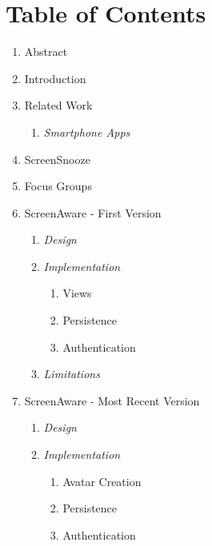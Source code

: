 \documentclass[12pt, title page, manuscript, nonacm]{acmart}
\begin{document}
\section*{Table of Contents}
\begin{enumerate}[label=\arabic*,leftmargin=*,labelsep=2ex,ref=\arabic*]
    \item Abstract 
    \item Introduction 
    \item Related Work 
    \begin{enumerate}[label*=.\arabic*,leftmargin=*,labelsep=2ex]
        \item \textit{Smartphone Apps} 
    \end{enumerate}
    \item ScreenSnooze 
    \item Focus Groups 
    \item ScreenAware - First Version 
    \begin{enumerate}[label*=.\arabic*,leftmargin=*,labelsep=2ex]
        \item \textit{Design} 
        \item \textit{Implementation} 
        \begin{enumerate}[label*=.\arabic*,leftmargin=*,labelsep=2ex]
            \item {Views} 
            \item {Persistence} 
            \item {Authentication} 
        \end{enumerate}
        \item \textit{Limitations} 
    \end{enumerate}
    \item ScreenAware - Most Recent Version 
     \begin{enumerate}[label*=.\arabic*,leftmargin=*,labelsep=2ex]
        \item \textit{Design} 
        \item \textit{Implementation} 
        \begin{enumerate}[label*=.\arabic*,leftmargin=*,labelsep=2ex]
            \item Avatar Creation 
            \item Persistence 
            \item Authentication 

\end{enumerate}
\end{enumerate}
\end{enumerate}
\end{document}
